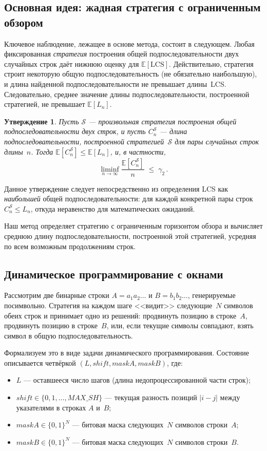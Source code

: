 \documentclass[12pt,a4paper]{article}
\newtheorem{proposition}{Утверждение}
\begin{document}
\subsection{Основная идея: жадная стратегия с ограниченным обзором}

Ключевое наблюдение, лежащее в основе метода, состоит в следующем.
Любая фиксированная \emph{стратегия} построения общей подпоследовательности двух случайных строк даёт нижнюю оценку для $\mathbb{E}[\mathrm{LCS}]$.
Действительно, стратегия строит некоторую общую подпоследовательность (не обязательно наибольшую), и длина найденной подпоследовательности не превышает длины~LCS.
Следовательно, среднее значение длины подпоследовательности, построенной стратегией, не превышает $\mathbb{E}[L_n]$.

\begin{proposition}
Пусть $\mathcal{S}$ --- произвольная стратегия построения общей подпоследовательности двух строк, и пусть $C_n^{\mathcal{S}}$ --- длина подпоследовательности, построенной стратегией~$\mathcal{S}$ для пары случайных строк длины~$n$.
Тогда $\mathbb{E}[C_n^{\mathcal{S}}] \leq \mathbb{E}[L_n]$, и, в частности,
\[
  \liminf_{n \to \infty} \frac{\mathbb{E}[C_n^{\mathcal{S}}]}{n} \;\leq\; \gamma_2\,.
\]
\end{proposition}

Данное утверждение следует непосредственно из определения LCS как \emph{наибольшей} общей подпоследовательности: для каждой конкретной пары строк $C_n^{\mathcal{S}} \leq L_n$, откуда неравенство для математических ожиданий.

Наш метод определяет стратегию с ограниченным горизонтом обзора и вычисляет среднюю длину подпоследовательности, построенной этой стратегией, усредняя по всем возможным продолжениям строк.

\subsection{Динамическое программирование с окнами}

Рассмотрим две бинарные строки $A = a_1 a_2 \ldots$ и $B = b_1 b_2 \ldots$\!, генерируемые посимвольно.
Стратегия на каждом шаге <<видит>> следующие~$N$ символов обеих строк и принимает одно из решений: продвинуть позицию в строке~$A$, продвинуть позицию в строке~$B$, или, если текущие символы совпадают, взять символ в общую подпоследовательность.

Формализуем это в виде задачи динамического программирования.
Состояние описывается четвёркой $(L, \mathit{shift}, \mathit{maskA}, \mathit{maskB})$, где:
\begin{itemize}
  \item $L$ --- оставшееся число шагов (длина недопроцессированной части строк);
  \item $\mathit{shift} \in \{0, 1, \ldots, \mathit{MAX\_SH}\}$ --- текущая разность позиций $|i - j|$ между указателями в строках $A$ и~$B$;
  \item $\mathit{maskA} \in \{0,1\}^N$ --- битовая маска следующих~$N$ символов строки~$A$;
  \item $\mathit{maskB} \in \{0,1\}^N$ --- битовая маска следующих~$N$ символов строки~$B$.
\end{itemize}
\end{document}
